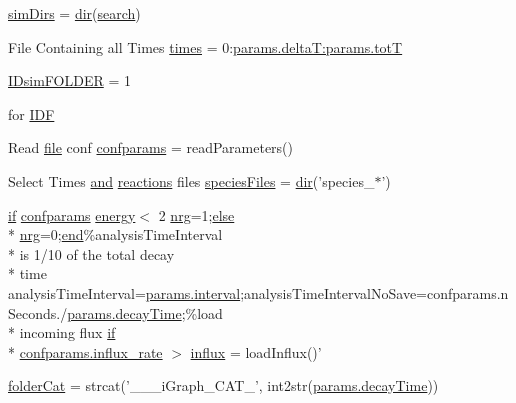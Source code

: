\begin{DoxyCompactItemize}
\hyperlink{a00028_aae5035eb84b89176ed5b06e136325eff}{sim\+Dirs} = \hyperlink{a00113_a4ca269cf93df1b512b52174c1a256fe5}{dir}(\hyperlink{a00028_ab3186e0326a3b47b2cfcb5577ab5139f}{search})
\item 
File Containing all Times \hyperlink{a00028_a47868b053902b822eab5c738a67a633a}{times} = 0\+:\hyperlink{a00036_aa9758857dd92f7845934f06daa7c4120}{params.\+delta\+T\+:params.\+tot\+T}
\item 
\hyperlink{a00028_aeef3e34bd64eec758eac16f004cdcef0}{I\+Dsim\+F\+O\+L\+D\+E\+R} = 1
\item 
for \hyperlink{a00028_a8acdc1bee73718b1ffcfc7eb26968f48}{I\+D\+F}
\item 
Read \hyperlink{a00110_a4e8353d6c62cf54bf4a1a8f63e56b8c3}{file} conf \hyperlink{a00028_a000cb2f4b2f69aebbfb0e8e0809567f6}{confparams} = read\+Parameters()
\item 
Select Times \hyperlink{a00028_a170f8acb213f91bf71c77b1d20bceb33}{and} \hyperlink{a00020}{reactions} files \hyperlink{a00028_af5703745c2c2a6af7f62da460994d9c2}{species\+Files} = \hyperlink{a00113_a4ca269cf93df1b512b52174c1a256fe5}{dir}('species\+\_$\ast$')
\item 
\hyperlink{a00030_a01d55766b8058903dd360b4bda71f9f5}{if} \hyperlink{a00033_a53a794fb4119b36e89d14a405e075596}{confparams} \hyperlink{a00113_ac002779c383d2cc783e881f94449de66}{energy}$<$ 2 \hyperlink{a00028_af837f695e5b67c86016c1a82608c38b4}{nrg}=1;\hyperlink{a00031_af5946383720aa572eb93e1e63afc23c2}{else} \\*
\hyperlink{a00028_af837f695e5b67c86016c1a82608c38b4}{nrg}=0;\hyperlink{a00025_afb358f48b1646c750fb9da6c6585be2b}{end}\%analysis\+Time\+Interval \\*
is 1/10 of the total decay \\*
time analysis\+Time\+Interval=\hyperlink{a00028_a4d8f56ee83b9b4dbe17b218746a1768c}{params.\+interval};analysis\+Time\+Interval\+No\+Save=confparams.\+n\+Seconds./\hyperlink{a00036_afb6aa83fb78c663f3b39be2380842a8b}{params.\+decay\+Time};\%load \\*
incoming flux \hyperlink{a00030_a01d55766b8058903dd360b4bda71f9f5}{if} \\*
\hyperlink{a00113_ad795c71664f3161dc8f7a769341daadf}{confparams.\+influx\+\_\+rate} $>$ \hyperlink{a00028_a637d2af7e7b03600bcaf1931b999e3fc}{influx} = load\+Influx()'
\item 
\hyperlink{a00028_ac4793cb55101110d228ded89ce9caa48}{folder\+Cat} = strcat('\+\_\+\+\_\+\_\+i\+Graph\+\_\+\+C\+A\+T\+\_\+', int2str(\hyperlink{a00036_afb6aa83fb78c663f3b39be2380842a8b}{params.\+decay\+Time}))

\end{DoxyCompactItemize}
